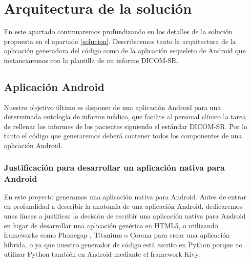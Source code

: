 
\section{Arquitectura de la solución}
En este apartado continuaremos profundizando en los detalles de la solución propuesta en el apartado \ref{solucion}. Describiremos tanto la arquitectura de la aplicación generadora del código como de la aplicación esqueleto de Android que instanciaremos con la plantilla de un informe DICOM-SR.\par

\subsection{Aplicación Android}
Nuestro objetivo último es disponer de una aplicación Android para una determinada ontología de informe médico,  que facilite al personal clínico la tarea de rellenar los informes de los pacientes siguiendo el estándar DICOM-SR. Por lo tanto el código que generaremos deberá contener todos los componentes de una aplicación Android.\par


\subsubsection{Justificación para desarrollar un aplicación nativa para Android}

En este proyecto generamos una aplicación nativa para Android. Antes de entrar en profundidad a describir la anatomía de una aplicación Android, dedicaremos unas líneas a justificar la decisión de escribir una aplicación nativa para Android en lugar de desarrollar una aplicación genérica en HTML5, o utilizando frameworks como Phonegap \cite{phonegap}, Titanium \cite{titanium} o Corona \cite{corona} para crear una aplicación híbrida, o ya que nuestro generador de código está escrito en Python porque no utilizar Python también en Android mediante el framework Kivy\cite{kivy}.\medskip\par

